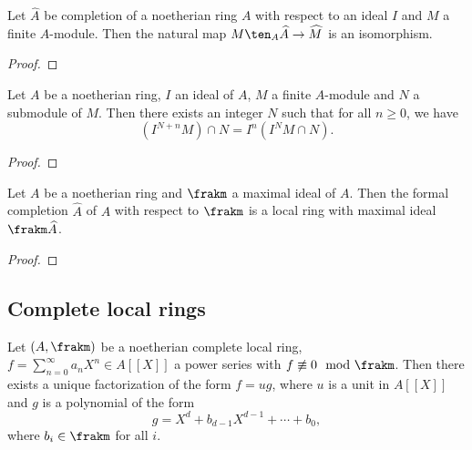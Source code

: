     \begin{proposition}\label{prop: completion and tensor product}
        Let \(\widehat{A}\) be completion of a noetherian ring \(A\) with respect to an ideal \(I\) and \(M\) a finite \(A\)-module. 
        Then the natural map \(M \ten_A \widehat{A} \to \widehat{M}\) is an isomorphism.
    \end{proposition}
    \begin{proof}
    \end{proof}

    \begin{theorem}\label{thm: Artin Rees Lemma}
        Let \(A\) be a noetherian ring, \(I\) an ideal of \(A\), \(M\) a finite \(A\)-module and \(N\) a submodule of \(M\). 
        Then there exists an integer \(N\) such that for all \(n \geq 0\), we have
        \[ (I^{N+n}M) \cap N = I^n (I^N M \cap N). \]
    \end{theorem}
    \begin{proof}
    \end{proof}

    \begin{proposition}\label{prop: completion with respect to maximal ideal is local}
        Let \(A\) be a noetherian ring and \(\frakm\) a maximal ideal of \(A\). 
        Then the formal completion \(\widehat{A}\) of \(A\) with respect to \(\frakm\) is a local ring with maximal ideal \(\frakm \widehat{A}\).
    \end{proposition}
    \begin{proof}
    \end{proof}

\subsection{Complete local rings}

    \begin{definition}\label{def: coefficient rings}
        
    \end{definition}

    \begin{theorem}\label{thm: Weierstrass Preparation Theorem}
        Let \((A,\frakm)\) be a noetherian complete local ring, \(f = \sum_{n=0}^\infty a_n X^n \in A[[X]]\) a power series with \(f \not\equiv 0 \mod \frakm\).
        Then there exists a unique factorization of the form \(f = u g\), where \(u\) is a unit in \(A[[X]]\) and \(g\) is a polynomial of the form
        \[ g = X^d + b_{d-1} X^{d-1} + \cdots + b_0, \]
        where \(b_i \in \frakm\) for all \(i\).
    \end{theorem}

